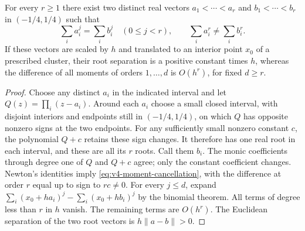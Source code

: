 \begin{lemma}\label{lem:v4-root-testing}
For every $r\ge1$ there exist two distinct real vectors
$a_1<\cdots<a_r$ and $b_1<\cdots<b_r$ in $(-1/4,1/4)$ such that
\begin{equation}
 \sum_i a_i^j=\sum_i b_i^j\quad(0\le j<r),\qquad
 \sum_i a_i^r\ne\sum_i b_i^r.                                  \label{eq:v4-moment-cancellation}
\end{equation}
If these vectors are scaled by $h$ and translated to an interior
point $x_0$ of a prescribed cluster, their root separation is a
positive constant times $h$, whereas the difference of all moments
of orders $1,\ldots,d$ is $O(h^r)$, for fixed $d\ge r$.
\end{lemma}
\begin{proof}
Choose any distinct $a_i$ in the indicated interval and let
$Q(z)=\prod_i(z-a_i)$. Around each $a_i$ choose a small closed
interval, with disjoint interiors and endpoints still in $(-1/4,1/4)$,
on which $Q$ has opposite nonzero signs at the two endpoints.
For any sufficiently small nonzero constant $c$, the polynomial
$Q+c$ retains these sign changes. It therefore has one real root in
each interval, and these are all its $r$ roots. Call them $b_i$.
The monic coefficients through degree one of $Q$ and $Q+c$ agree;
only the constant coefficient changes. Newton's identities imply
\eqref{eq:v4-moment-cancellation}, with the difference at order $r$
equal up to sign to $rc\ne0$.
For every $j\le d$, expand
$\sum_i(x_0+ha_i)^j-\sum_i(x_0+hb_i)^j$ by the binomial theorem.
All terms of degree less than $r$ in $h$ vanish. The remaining
terms are $O(h^r)$. The Euclidean separation of the two root vectors
is $h\|a-b\|>0$.
\end{proof}

